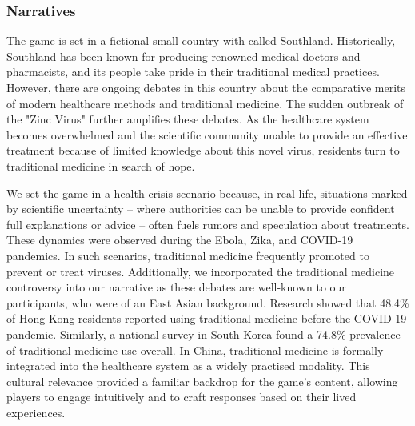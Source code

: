 

\subsubsection{Narratives}
The game is set in a fictional small country with called Southland. Historically, Southland has been known for producing renowned medical doctors and pharmacists, and its people take pride in their traditional medical practices. However, there are ongoing debates in this country about the comparative merits of modern healthcare methods and traditional medicine. %
The sudden outbreak of the "Zinc Virus" further amplifies these debates. As the healthcare system becomes overwhelmed and the scientific community unable to provide an effective treatment because of limited knowledge about this novel virus, residents turn to traditional medicine in search of hope.

We set the game in a health crisis scenario because, in real life, situations marked by scientific uncertainty – where authorities can be unable to provide confident full explanations or advice – often  fuels rumors and speculation about treatments\cite{wang2019systematic}. These dynamics were observed during the Ebola\cite{fung2016social}, Zika\cite{wood2018propagating}, and COVID-19 pandemics\cite{suarez2021prevalence}. In such scenarios, traditional medicine frequently promoted to prevent or treat viruses\cite{lam2021public,mutombo2023experiences}. Additionally, we incorporated the traditional medicine controversy into our narrative as these debates are well-known to our participants, who were of an East Asian background. Research showed that 48.4\% of Hong Kong residents reported using traditional medicine before the COVID-19 pandemic\cite{lam2021public}. Similarly, a national survey in South Korea found a 74.8\% prevalence of traditional medicine use overall\cite{ock2009use}. In China, traditional medicine is formally integrated into the healthcare system as a widely practised modality\cite{chung2023implementation}. This cultural relevance provided a familiar backdrop for the game's content, allowing players to engage intuitively and to craft responses based on their lived experiences.

